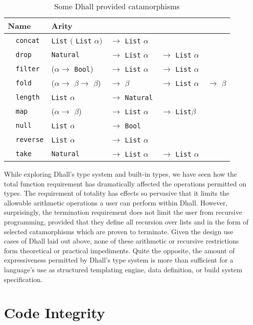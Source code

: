 \documentclass[12pt]{diazessay}
\newcommand{\F}[1]
{$\quad$\texttt{#1}
}
\newcommand{\A}{$\alpha$}
\newcommand{\B}{$\beta$}
\newcommand{\Bool   }{\texttt{Bool}}
\newcommand{\Nat    }{\texttt{Natural}}
\newcommand{\List   }{\texttt{List}}
\begin{document}
\begin{table}[h]
	\centering
		\begin{tabular}{ |l|llll| } 
			\hline
			Name & \multicolumn{4}{l}{Arity} \vline \\
			\hline
			\F{concat} & \List{} $($ \List{} \A $)$ &$\rightarrow$ \List{} \A & & \\
			\F{drop} &  \Nat{} & $\rightarrow$ \List{} \A &$\rightarrow$ \List{} \A & \\
			\F{filter} & (\A $\rightarrow$ \Bool{}) & $\rightarrow$ \List{} \A &$\rightarrow$ \List{} \A & \\
			\F{fold} & (\A $\rightarrow$ \B $\rightarrow$ \B) &$\rightarrow$ \B  & $\rightarrow$ \List{} \A & $\rightarrow$ \B \\
			\F{length} & \List{} \A & $\rightarrow$ \Nat & & \\
			\F{map} & (\A $\rightarrow$ \B) & $\rightarrow$ \List{} \A & $\rightarrow$ \List \B & \\
			\F{null} & \List{} \A & $\rightarrow$ \Bool & & \\
			\F{reverse} & \List{} \A & $\rightarrow$ \List{} \A & & \\
			\F{take} &  \Nat{} & $\rightarrow$ \List{} \A &$\rightarrow$ \List{} \A & \\
			\hline
		\end{tabular}
	\caption{Some Dhall provided catamorphisms}
	\label{tab:catamorphisms}
\end{table}

While exploring Dhall's type system and built-in types, we have seen how the total function requirement has dramatically affected the operations permitted on types.
The requirement of totality has effects so pervasive that it limits the allowable arithmetic operations a user can perform within Dhall.
However, surprisingly, the termination requirement does not limit the user from recursive programming, provided that they define all recursion over lists and in the form of selected catamorphisms which are proven to terminate.
Given the design use cases of Dhall laid out above, none of these arithmetic or recursive restrictions form theoretical or practical impediments.
Quite the opposite, the amount of expressiveness permitted by Dhall's type system is more than sufficient for a language's use as structured templating engine, data definition, or build system specification.

\section*{Code Integrity}
\end{document}
